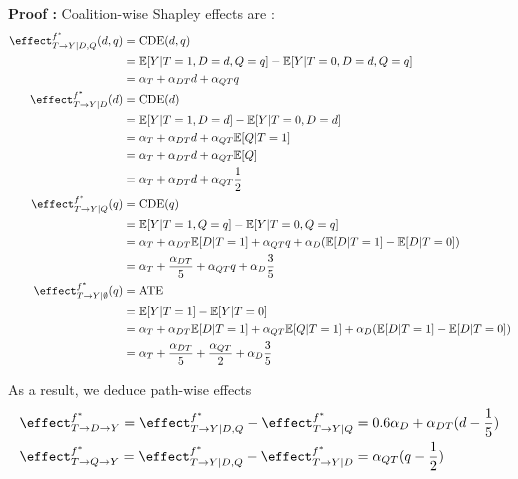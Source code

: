 \textbf{Proof :} Coalition-wise Shapley effects are :
\begin{align*}
     \effect^{f^*}_{T \rightarrow Y | D, Q}(d,q)
     &= \text{CDE}(d,q) \\
     &= \mathbb{E}[Y|T=1,D=d,Q=q] - \mathbb{E}[Y|T=0,D=d,Q=q] \\ 
     &= \alpha_T + \alpha_{DT}d + \alpha_{QT}q \\
    \effect^{f^*}_{T \rightarrow Y | D}(d)
     &= \text{CDE}(d) \\
     &= \mathbb{E}[Y|T=1,D=d] - \mathbb{E}[Y|T=0,D=d] \\ 
     &= \alpha_T + \alpha_{DT}d + \alpha_{QT}\mathbb{E}[Q|T=1] \\
     &= \alpha_T + \alpha_{DT}d + \alpha_{QT}\mathbb{E}[Q] \\
     &= \alpha_T + \alpha_{DT}d + \alpha_{QT}\frac{1}{2} \\
    \effect^{f^*}_{T \rightarrow Y | Q}(q)
     &= \text{CDE}(q) \\
     &= \mathbb{E}[Y|T=1,Q=q] - \mathbb{E}[Y|T=0,Q=q] \\ 
     &= \alpha_T + \alpha_{DT}\mathbb{E}[D|T=1] + \alpha_{QT}q + \alpha_D(\mathbb{E}[D|T=1] - \mathbb{E}[D|T=0]) \\
     &= \alpha_T + \frac{\alpha_{DT}}{5} + \alpha_{QT}q + \alpha_D\frac{3}{5} \\
    \effect^{f^*}_{T \rightarrow Y | \emptyset}(q)
     &= \text{ATE} \\
     &= \mathbb{E}[Y|T=1] - \mathbb{E}[Y|T=0] \\ 
     &= \alpha_T + \alpha_{DT}\mathbb{E}[D|T=1] + \alpha_{QT}\mathbb{E}[Q|T=1] + \alpha_D(\mathbb{E}[D|T=1] - \mathbb{E}[D|T=0]) \\
     &= \alpha_T + \frac{\alpha_{DT}}{5} + \frac{\alpha_{QT}}{2} + \alpha_D\frac{3}{5} \\
\end{align*}

As a result, we deduce path-wise effects
\begin{align*}
    &\effect^{f^*}_{T \rightarrow D \rightarrow Y} = \effect^{f^*}_{T \rightarrow Y | D, Q} - \effect^{f^*}_{T \rightarrow Y | Q} = 0.6 \alpha_D + \alpha_{DT} (d - \frac{1}{5}) \\
    &\effect^{f^*}_{T \rightarrow Q \rightarrow Y} = \effect^{f^*}_{T \rightarrow Y | D, Q} - \effect^{f^*}_{T \rightarrow Y | D} = \alpha_{QT}(q - \frac{1}{2}) \\
\end{align*}

